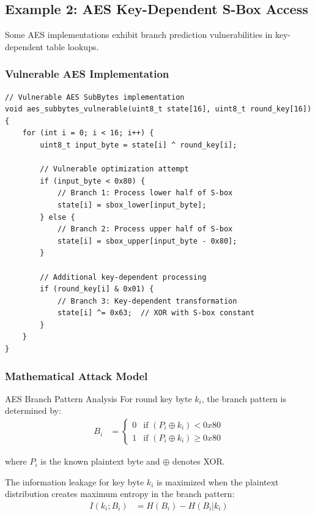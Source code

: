 \documentclass[11pt,a4paper]{article}
\theoremstyle{definition}
\begin{document}
\subsection{Example 2: AES Key-Dependent S-Box Access}

Some AES implementations exhibit branch prediction vulnerabilities in key-dependent table lookups.

\subsubsection{Vulnerable AES Implementation}

\begin{lstlisting}[caption={AES SubBytes with Key-Dependent Branching (Vulnerable)}]
// Vulnerable AES SubBytes implementation
void aes_subbytes_vulnerable(uint8_t state[16], uint8_t round_key[16]) {
    for (int i = 0; i < 16; i++) {
        uint8_t input_byte = state[i] ^ round_key[i];
        
        // Vulnerable optimization attempt
        if (input_byte < 0x80) {
            // Branch 1: Process lower half of S-box
            state[i] = sbox_lower[input_byte];
        } else {
            // Branch 2: Process upper half of S-box  
            state[i] = sbox_upper[input_byte - 0x80];
        }
        
        // Additional key-dependent processing
        if (round_key[i] & 0x01) {
            // Branch 3: Key-dependent transformation
            state[i] ^= 0x63;  // XOR with S-box constant
        }
    }
}
\end{lstlisting}

\subsubsection{Mathematical Attack Model}

\begin{mathematicsbox}{AES Branch Pattern Analysis}
For round key byte $k_i$, the branch pattern is determined by:
\begin{align}
B_i &= \begin{cases}
0 & \text{if } (P_i \oplus k_i) < 0x80 \\
1 & \text{if } (P_i \oplus k_i) \geq 0x80
\end{cases}
\end{align}

where $P_i$ is the known plaintext byte and $\oplus$ denotes XOR.

The information leakage for key byte $k_i$ is maximized when the plaintext distribution creates maximum entropy in the branch pattern:
\begin{align}
I(k_i; B_i) &= H(B_i) - H(B_i|k_i)
\end{align}
\end{mathematicsbox}
\end{document}
